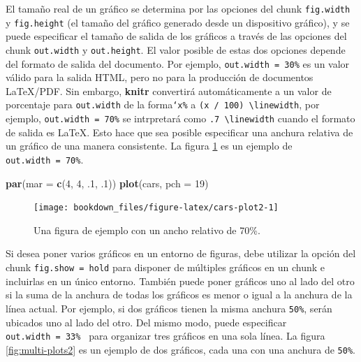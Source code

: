 \documentclass[12pt,]{krantz}
\makeatletter
\newenvironment{Shaded}{\begin{snugshade}}{\end{snugshade}}
\newcommand{\KeywordTok}[1]{\textcolor[rgb]{0.13,0.29,0.53}{\textbf{{#1}}}}
\newcommand{\DataTypeTok}[1]{\textcolor[rgb]{0.13,0.29,0.53}{{#1}}}
\newcommand{\DecValTok}[1]{\textcolor[rgb]{0.00,0.00,0.81}{{#1}}}
\newcommand{\NormalTok}[1]{{#1}}
\newenvironment{kframe}{%
\medskip{}
\setlength{\fboxsep}{.8em}
 \def\at@end@of@kframe{}%
 \ifinner\ifhmode%
  \def\at@end@of@kframe{\end{minipage}}%
  \begin{minipage}{\columnwidth}%
 \fi\fi%
 \def\FrameCommand##1{\hskip\@totalleftmargin \hskip-\fboxsep
 \colorbox{shadecolor}{##1}\hskip-\fboxsep
     \hskip-\linewidth \hskip-\@totalleftmargin \hskip\columnwidth}%
 \MakeFramed {\advance\hsize-\width
   \@totalleftmargin\z@ \linewidth\hsize
   \@setminipage}}%
 {\par\unskip\endMakeFramed%
 \at@end@of@kframe}
\renewenvironment{Shaded}{\begin{kframe}}{\end{kframe}}
\theoremstyle{definition}
\theoremstyle{definition}
\theoremstyle{remark}
\makeatother
\begin{document}
El tamaño real de un gráfico se determina por las opciones del chunk
\texttt{fig.width} y \texttt{fig.height} (el tamaño del gráfico generado
desde un dispositivo gráfico), y se puede especificar el tamaño de
salida de los gráficos a través de las opciones del chunk
\texttt{out.width} y \texttt{out.height}. El valor posible de estas dos
opciones depende del formato de salida del documento. Por ejemplo,
\texttt{out.width\ =\ \textquotesingle{}30\%\textquotesingle{}} es un
valor válido para la salida HTML, pero no para la producción de
documentos LaTeX/PDF. Sin embargo, \textbf{knitr} convertirá
automáticamente a un valor de porcentaje para \texttt{out.width} de la
forma\texttt{`x\%} a \texttt{(x\ /\ 100)\ \textbackslash{}linewidth},
por ejemplo,
\texttt{out.width\ =\ \textquotesingle{}70\%\textquotesingle{}} se
intrpretará como \texttt{.7\ \textbackslash{}linewidth} cuando el
formato de salida es LaTeX. Esto hace que sea posible especificar una
anchura relativa de un gráfico de una manera consistente. La figura
\ref{fig:cars-plot2} es un ejemplo de \texttt{out.width\ =\ 70\%}.

\begin{Shaded}
\begin{Highlighting}[]
\KeywordTok{par}\NormalTok{(}\DataTypeTok{mar =} \KeywordTok{c}\NormalTok{(}\DecValTok{4}\NormalTok{, }\DecValTok{4}\NormalTok{, .}\DecValTok{1}\NormalTok{, .}\DecValTok{1}\NormalTok{))}
\KeywordTok{plot}\NormalTok{(cars, }\DataTypeTok{pch =} \DecValTok{19}\NormalTok{)}
\end{Highlighting}
\end{Shaded}

\begin{figure}
\texttt{[image: bookdown\_files/figure-latex/cars-plot2-1]} \caption{Una figura de ejemplo con un ancho relativo de 70\%.}\label{fig:cars-plot2}
\end{figure}

Si desea poner varios gráficos en un entorno de figuras, debe utilizar
la opción del chunk
\texttt{fig.show\ =\ \textquotesingle{}hold\textquotesingle{}} para
disponer de múltiples gráficos en un chunk e incluirlas en un único
entorno. También puede poner gráficos uno al lado del otro si la suma de
la anchura de todas los gráficos es menor o igual a la anchura de la
línea actual. Por ejemplo, si dos gráficos tienen la misma anchura
\texttt{50\%}, serán ubicados uno al lado del otro. Del mismo modo,
puede especificar
\texttt{out.width\ =\ \textquotesingle{}33\%\ \textquotesingle{}} para
organizar tres gráficos en una sola línea. La figura
\ref{fig:multi-plots2} es un ejemplo de dos gráficos, cada una con una
anchura de \texttt{50\%}.
\end{document}
